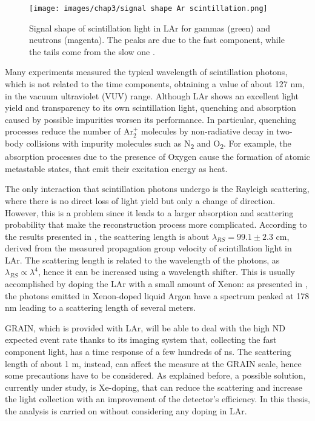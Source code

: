 \begin{figure}[h!]
    \centering
    \texttt{[image: images/chap3/signal shape Ar scintillation.png]}
    \caption{Signal shape of scintillation light in LAr for gammas (green) and neutrons (magenta). The peaks are due to the fast component, while the tails come from the slow one \cite{Scint-Ar}.}
    \label{fig:signal-Ar-light}
\end{figure}

Many experiments measured the typical wavelength of scintillation photons, which is not related to the time components, obtaining a value of about 127 nm, in the vacuum ultraviolet (VUV) range. Although LAr shows an excellent light yield and transparency to its own scintillation light, quenching and absorption caused by possible impurities worsen its performance. In particular, quenching processes reduce the number of $\text{Ar}^+_2$ molecules by non-radiative decay in two-body collisions with impurity molecules such as N\textsubscript{2} and O\textsubscript{2}. For example, the absorption processes due to the presence of Oxygen cause the formation of atomic metastable states, that emit their excitation energy as heat.

The only interaction that scintillation photons undergo is the Rayleigh scattering, where there is no direct loss of light yield but only a change of direction. However, this is a problem since it leads to a larger absorption and scattering probability that make the reconstruction process more complicated. According to the results presented in \cite{Ar-rayleigh}, the scattering length is about $\lambda_{RS} = 99.1 \pm 2.3$ cm, derived from the measured propagation group velocity of scintillation light in LAr. The scattering length is related to the wavelength of the photons, as $\lambda_{RS} \propto \lambda^4$, hence it can be increased using a wavelength shifter. This is usually accomplished by doping the LAr with a small amount of Xenon: as presented in \cite{Xe-doping}, the photons emitted in Xenon-doped liquid Argon have a spectrum peaked at 178 nm leading to a scattering length of several meters.

GRAIN, which is provided with LAr, will be able to deal with the high ND expected event rate thanks to its imaging system that, collecting the fast component light, has a time response of a few hundreds of ns. The scattering length of about 1 m, instead, can affect the measure at the GRAIN scale, hence some precautions have to be considered. As explained before, a possible solution, currently under study, is Xe-doping, that can reduce the scattering and increase the light collection with an improvement of the detector's efficiency. In this thesis, the analysis is carried on without considering any doping in LAr.

